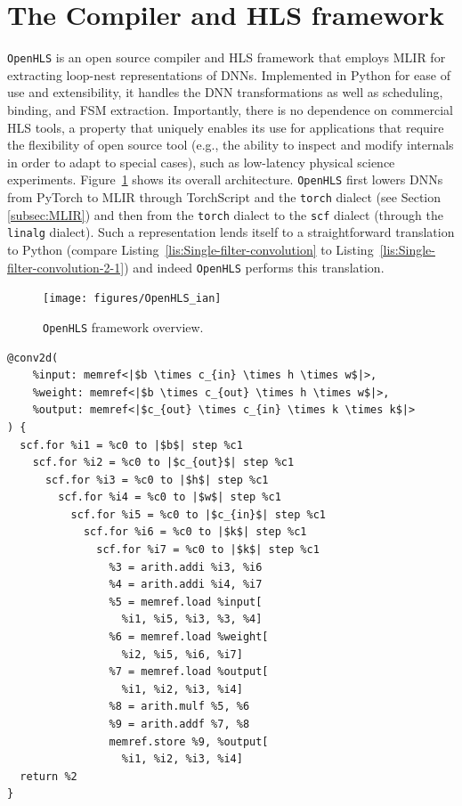 \documentclass[10pt]{sig-alternate}
\begin{document}
\section{The Compiler and HLS framework}\label{sec:OpenHLS-compiler-and}

\texttt{OpenHLS} is an open source compiler and HLS framework that employs MLIR
for extracting loop-nest representations of DNNs. Implemented
in Python for ease of use and extensibility, it handles the DNN transformations as well as scheduling, binding, and FSM extraction. Importantly, there is no dependence on commercial HLS tools, a property that uniquely enables its use for applications that require the flexibility of open source tool (e.g., the ability to inspect and modify internals in order to adapt to special cases), such as low-latency physical science experiments.
Figure~\ref{fig:OpenHLS-framework-overview.-3} shows its overall architecture.
\texttt{OpenHLS} first lowers DNNs from PyTorch to
MLIR through TorchScript and the \texttt{torch} dialect (see Section
\ref{subsec:MLIR}) and then from the \texttt{torch}
dialect to the \texttt{scf} dialect (through the \texttt{linalg} dialect).
Such a representation lends itself to a straightforward translation
to Python (compare Listing~\ref{lis:Single-filter-convolution} to
Listing~\ref{lis:Single-filter-convolution-2-1}) and indeed \texttt{OpenHLS}
performs this translation.
\begin{figure}[tbh]
\centering{}\texttt{[image: figures/OpenHLS\_ian]}\caption{\texttt{OpenHLS} framework overview.\label{fig:OpenHLS-framework-overview.-3}}
\end{figure}
\begin{listing}
\begin{verbatim}
@conv2d(
    %input: memref<|$b \times c_{in} \times h \times w$|>,
    %weight: memref<|$b \times c_{out} \times h \times w$|>,
    %output: memref<|$c_{out} \times c_{in} \times k \times k$|>
) {
  scf.for %i1 = %c0 to |$b$| step %c1
    scf.for %i2 = %c0 to |$c_{out}$| step %c1
      scf.for %i3 = %c0 to |$h$| step %c1
        scf.for %i4 = %c0 to |$w$| step %c1
          scf.for %i5 = %c0 to |$c_{in}$| step %c1
            scf.for %i6 = %c0 to |$k$| step %c1
              scf.for %i7 = %c0 to |$k$| step %c1
                %3 = arith.addi %i3, %i6
                %4 = arith.addi %i4, %i7
                %5 = memref.load %input[
                  %i1, %i5, %i3, %3, %4]
                %6 = memref.load %weight[
                  %i2, %i5, %i6, %i7]
                %7 = memref.load %output[
                  %i1, %i2, %i3, %i4]
                %8 = arith.mulf %5, %6
                %9 = arith.addf %7, %8
                memref.store %9, %output[
                  %i1, %i2, %i3, %i4]
  return %2
}
\end{verbatim}
\caption{\texttt{scf} dialect loop representation of %
Listing
\ref{lis:Single-filter-convolution}.\label{lis:Single-filter-convolution-2-1}}
\end{listing}
\end{document}

